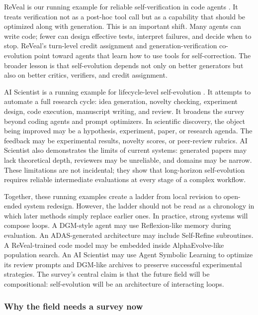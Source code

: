 ReVeal is our running example for reliable self-verification in code agents \cite{reveal2025}. It treats verification not as a post-hoc tool call but as a capability that should be optimized along with generation. This is an important shift. Many agents can write code; fewer can design effective tests, interpret failures, and decide when to stop. ReVeal's turn-level credit assignment and generation-verification co-evolution point toward agents that learn how to use tools for self-correction. The broader lesson is that self-evolution depends not only on better generators but also on better critics, verifiers, and credit assignment.

AI Scientist is a running example for lifecycle-level self-evolution \cite{aiscientist2024}. It attempts to automate a full research cycle: idea generation, novelty checking, experiment design, code execution, manuscript writing, and review. It broadens the survey beyond coding agents and prompt optimizers. In scientific discovery, the object being improved may be a hypothesis, experiment, paper, or research agenda. The feedback may be experimental results, novelty scores, or peer-review rubrics. AI Scientist also demonstrates the limits of current systems: generated papers may lack theoretical depth, reviewers may be unreliable, and domains may be narrow. These limitations are not incidental; they show that long-horizon self-evolution requires reliable intermediate evaluations at every stage of a complex workflow.

Together, these running examples create a ladder from local revision to open-ended system redesign. However, the ladder should not be read as a chronology in which later methods simply replace earlier ones. In practice, strong systems will compose loops. A DGM-style agent may use Reflexion-like memory during evaluation. An ADAS-generated architecture may include Self-Refine subroutines. A ReVeal-trained code model may be embedded inside AlphaEvolve-like population search. An AI Scientist may use Agent Symbolic Learning to optimize its review prompts and DGM-like archives to preserve successful experimental strategies. The survey's central claim is that the future field will be compositional: self-evolution will be an architecture of interacting loops.

\subsubsection{Why the field needs a survey now}

